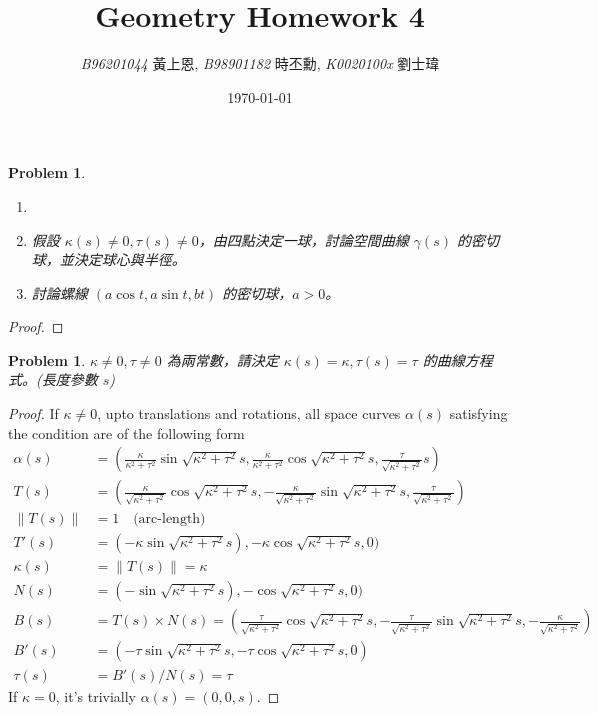 \documentclass[10pt,a4paper]{article}
\newcommand{\LiHei}{\CJKfamily{lh}}
\newcounter{theProblemCounter}
\newtheorem{problem}[theProblemCounter]{Problem}
\begin{document}
\title{{Geometry Homework 4}}
\author{{\it{B96201044}} {\LiHei 黃上恩}, {\it{B98901182}} {\LiHei 時丕勳}, {\it{K0020100x}} {\LiHei 劉士瑋}}
\date{\today}
\maketitle

\setcounter{theProblemCounter}{2}
\begin{problem}
\begin{enumerate}
\item[]
\item[(a)] 假設 $\kappa(s)\ne 0, \tau(s)\ne 0$，由四點決定一球，討論空間曲線 $\gamma(s)$ 的密切球，並決定球心與半徑。
\item[(b)] 討論螺線 $(a\cos t, a\sin t, bt)$ 的密切球，$a>0$。
\end{enumerate}
\end{problem}
\begin{proof}
\end{proof}

\setcounter{theProblemCounter}{3}
\begin{problem}
$\kappa\ne 0, \tau \ne 0$ 為兩常數，請決定 $\kappa(s)=\kappa, \tau(s)=\tau$ 的曲線方程式。(長度參數 $s$)
\end{problem}
\begin{proof}
If $\kappa \neq 0$, upto translations and rotations, all space curves $\alpha(s)$ satisfying the condition are of the following form
\begin{align*}
\alpha(s) &= (\frac{\kappa}{\kappa^2 + \tau^2}\sin\sqrt{\kappa^2 + \tau^2}s, \frac{\kappa}{\kappa^2 + \tau^2}\cos\sqrt{\kappa^2 + \tau^2}s, \frac{\tau}{\sqrt{\kappa^2 + \tau^2}}s) \\
T(s) &= (\frac{\kappa}{\sqrt{\kappa^2 + \tau^2}}\cos\sqrt{\kappa^2 + \tau^2}s, -\frac{\kappa}{\sqrt{\kappa^2 + \tau^2}}\sin\sqrt{\kappa^2 + \tau^2}s, \frac{\tau}{\sqrt{\kappa^2 + \tau^2}}) \\
\|T(s)\| &= 1 \quad\text{(arc-length)}\\
T'(s) &= (-\kappa\sin\sqrt{\kappa^2 + \tau^2}s), -\kappa\cos\sqrt{\kappa^2 + \tau^2}s, 0) \\
\kappa(s) &= \|T(s)\| = \kappa \\
N(s) &= (-\sin\sqrt{\kappa^2 + \tau^2}s), -\cos\sqrt{\kappa^2 + \tau^2}s, 0) \\
B(s) &= T(s)\times N(s) = (\frac{\tau}{\sqrt{\kappa^2 + \tau^2}}\cos\sqrt{\kappa^2 + \tau^2}s, -\frac{\tau}{\sqrt{\kappa^2 + \tau^2}}\sin\sqrt{\kappa^2 + \tau^2}s, -\frac{\kappa}{\sqrt{\kappa^2 + \tau^2}}) \\
B'(s) &= (-\tau\sin\sqrt{\kappa^2 + \tau^2}s, -\tau\cos\sqrt{\kappa^2 + \tau^2}s, 0) \\
\tau(s) &= B'(s)/N(s) = \tau
\end{align*}
If $\kappa = 0$, it's trivially $\alpha(s) = (0, 0, s)$.
\end{proof}
\end{document}
